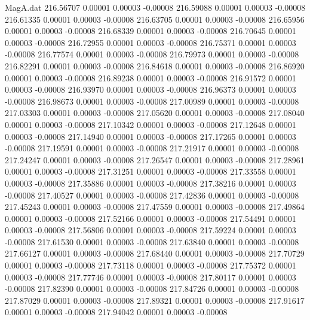\begin{filecontents}{MagA.dat}
 216.56707    0.00001    0.00003   -0.00008
 216.59088    0.00001    0.00003   -0.00008
 216.61335    0.00001    0.00003   -0.00008
 216.63705    0.00001    0.00003   -0.00008
 216.65956    0.00001    0.00003   -0.00008
 216.68339    0.00001    0.00003   -0.00008
 216.70645    0.00001    0.00003   -0.00008
 216.72955    0.00001    0.00003   -0.00008
 216.75371    0.00001    0.00003   -0.00008
 216.77574    0.00001    0.00003   -0.00008
 216.79973    0.00001    0.00003   -0.00008
 216.82291    0.00001    0.00003   -0.00008
 216.84618    0.00001    0.00003   -0.00008
 216.86920    0.00001    0.00003   -0.00008
 216.89238    0.00001    0.00003   -0.00008
 216.91572    0.00001    0.00003   -0.00008
 216.93970    0.00001    0.00003   -0.00008
 216.96373    0.00001    0.00003   -0.00008
 216.98673    0.00001    0.00003   -0.00008
 217.00989    0.00001    0.00003   -0.00008
 217.03303    0.00001    0.00003   -0.00008
 217.05620    0.00001    0.00003   -0.00008
 217.08040    0.00001    0.00003   -0.00008
 217.10342    0.00001    0.00003   -0.00008
 217.12648    0.00001    0.00003   -0.00008
 217.14940    0.00001    0.00003   -0.00008
 217.17265    0.00001    0.00003   -0.00008
 217.19591    0.00001    0.00003   -0.00008
 217.21917    0.00001    0.00003   -0.00008
 217.24247    0.00001    0.00003   -0.00008
 217.26547    0.00001    0.00003   -0.00008
 217.28961    0.00001    0.00003   -0.00008
 217.31251    0.00001    0.00003   -0.00008
 217.33558    0.00001    0.00003   -0.00008
 217.35886    0.00001    0.00003   -0.00008
 217.38216    0.00001    0.00003   -0.00008
 217.40527    0.00001    0.00003   -0.00008
 217.42836    0.00001    0.00003   -0.00008
 217.45243    0.00001    0.00003   -0.00008
 217.47559    0.00001    0.00003   -0.00008
 217.49864    0.00001    0.00003   -0.00008
 217.52166    0.00001    0.00003   -0.00008
 217.54491    0.00001    0.00003   -0.00008
 217.56806    0.00001    0.00003   -0.00008
 217.59224    0.00001    0.00003   -0.00008
 217.61530    0.00001    0.00003   -0.00008
 217.63840    0.00001    0.00003   -0.00008
 217.66127    0.00001    0.00003   -0.00008
 217.68440    0.00001    0.00003   -0.00008
 217.70729    0.00001    0.00003   -0.00008
 217.73118    0.00001    0.00003   -0.00008
 217.75372    0.00001    0.00003   -0.00008
 217.77746    0.00001    0.00003   -0.00008
 217.80117    0.00001    0.00003   -0.00008
 217.82390    0.00001    0.00003   -0.00008
 217.84726    0.00001    0.00003   -0.00008
 217.87029    0.00001    0.00003   -0.00008
 217.89321    0.00001    0.00003   -0.00008
 217.91617    0.00001    0.00003   -0.00008
 217.94042    0.00001    0.00003   -0.00008

\end{filecontents}

